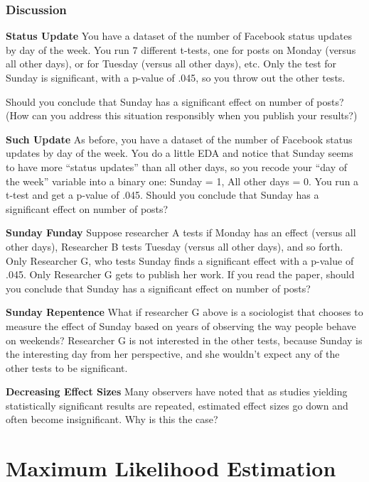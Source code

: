 \documentclass[
]{book}
\theoremstyle{definition}
\theoremstyle{definition}
\theoremstyle{definition}
\theoremstyle{definition}
\theoremstyle{remark}
\begin{document}
\hypertarget{discussion-3}{%
\subsection{Discussion}\label{discussion-3}}

\textbf{Status Update}
You have a dataset of the number of Facebook status updates by day of the week. You run 7 different t-tests, one for posts on Monday (versus all other days), or for Tuesday (versus all other days), etc. Only the test for Sunday is significant, with a p-value of .045, so you throw out the other tests.

Should you conclude that Sunday has a significant effect on number of posts? (How can you address this situation responsibly when you publish your results?)

\textbf{Such Update}
As before, you have a dataset of the number of Facebook status updates by day of the week. You do a little EDA and notice that Sunday seems to have more ``status updates'' than all other days, so you recode your ``day of the week'' variable into a binary one: Sunday = 1, All other days = 0. You run a t-test and get a p-value of .045. Should you conclude that Sunday has a significant effect on number of posts?

\textbf{Sunday Funday}
Suppose researcher A tests if Monday has an effect (versus all other days), Researcher B tests Tuesday (versus all other days), and so forth. Only Researcher G, who tests Sunday finds a significant effect with a p-value of .045. Only Researcher G gets to publish her work. If you read the paper, should you conclude that Sunday has a significant effect on number of posts?

\textbf{Sunday Repentence}
What if researcher G above is a sociologist that chooses to measure the effect of Sunday based on years of observing the way people behave on weekends? Researcher G is not interested in the other tests, because Sunday is the interesting day from her perspective, and she wouldn't expect any of the other tests to be significant.

\textbf{Decreasing Effect Sizes}
Many observers have noted that as studies yielding statistically significant results are repeated, estimated effect sizes go down and often become insignificant. Why is this the case?

\hypertarget{maximum-likelihood-estimation}{%
\chapter{Maximum Likelihood Estimation}\label{maximum-likelihood-estimation}}
\end{document}
